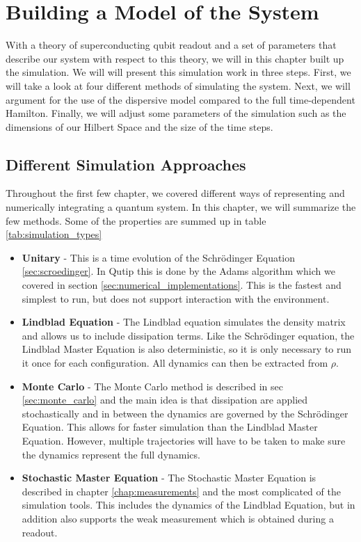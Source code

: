 \chapter{Building a Model of the System}\label{chap:model}
With a theory of superconducting qubit readout and a set of parameters that describe our system with respect to this theory, we will in this chapter built up the simulation. We will will present this simulation work in three steps. First, we will take a look at four different methods of simulating the system. Next, we will argument for the use of the dispersive model compared to the full time-dependent Hamilton. Finally, we will adjust some parameters of the simulation such as the dimensions of our Hilbert Space and the size of the time steps.

\section{Different Simulation Approaches}
Throughout the first few chapter, we covered different ways of representing and numerically integrating a quantum system. In this chapter, we will summarize the few methods. Some of the properties are summed up in table \ref{tab:simulation_types}

\begin{itemize}
    \item \textbf{Unitary} - This is a time evolution of the Schrödinger Equation \ref{sec:scroedinger}. In Qutip this is done by the Adams algorithm which we covered in section \ref{sec:numerical_implementations}. This is the fastest and simplest to run, but does not support interaction with the environment.  
    \item \textbf{Lindblad Equation} - The Lindblad equation simulates the density matrix and allows us to include dissipation terms. Like the Schrödinger equation, the Lindblad Master Equation is also deterministic, so it is only necessary to run it once for each configuration. All dynamics can then be extracted from $\rho$. 
    \item \textbf{Monte Carlo} - The Monte Carlo method is described in sec \ref{sec:monte_carlo} and the main idea is that dissipation are applied stochastically and in between the dynamics are governed by the Schrödinger Equation. This allows for faster simulation than the Lindblad Master Equation. However, multiple trajectories will have to be taken to make sure the dynamics represent the full dynamics.
    \item \textbf{Stochastic Master Equation} - The Stochastic Master Equation is described in chapter \ref{chap:measurements} and the most complicated of the simulation tools. This includes the dynamics of the Lindblad Equation, but in addition also supports the weak measurement which is obtained during a readout.
\end{itemize}

